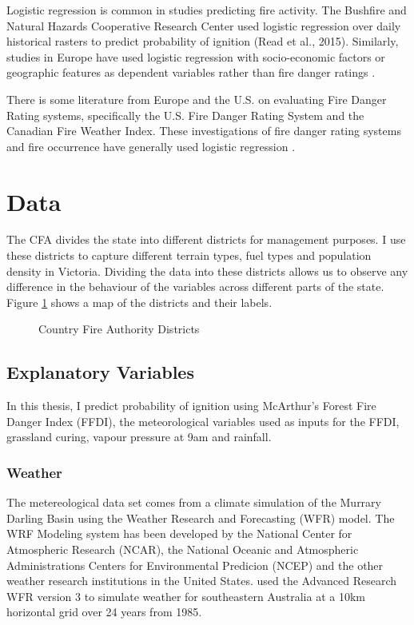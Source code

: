 \documentclass[11pt,a4paper]{article}
\begin{document}
Logistic regression is common in studies predicting fire activity. The Bushfire and Natural Hazards Cooperative Research Center used logistic regression over daily historical rasters to predict probability of ignition (Read et al., 2015). Similarly, studies in Europe have used logistic regression with socio-economic factors or geographic features as dependent variables rather than fire danger ratings \citep{del11, zhang13}. 

There is some literature from Europe and the U.S. on evaluating Fire Danger Rating systems, specifically the U.S. Fire Danger Rating System and the Canadian Fire Weather Index.  These investigations of fire danger rating systems and fire occurrence have  generally used logistic regression \citep{andrews03, padilla11}. 

\section{Data}

The CFA divides the state into different districts for management purposes. I use these districts to capture different terrain types, fuel types and population density in Victoria. Dividing the data into these districts allows us to observe any difference in the behaviour of the variables across different parts of the state. Figure \ref{fig:dist} shows a map of the districts and their labels. 

\begin{figure}[h]
	\centering 
	\caption{Country Fire Authority Districts} 
	\label{fig:dist} 
\end{figure}

\subsection{Explanatory Variables}

In this thesis, I predict probability of ignition using McArthur's Forest Fire Danger Index (FFDI), the meteorological variables used as inputs for the FFDI, grassland curing, vapour pressure at 9am and rainfall.  

\subsubsection{Weather}

The metereological data set comes from a climate simulation of the Murrary Darling Basin using the Weather Research and Forecasting (WFR) model. The WRF Modeling system has been developed by the National Center for Atmospheric Research (NCAR), the National Oceanic and Atmospheric Administrations Centers for Environmental Predicion (NCEP) and the other weather research institutions in the United States. \citet{evans10} used the Advanced Research WFR version 3 \citep{skamarock08} to simulate weather for southeastern Australia at a 10km horizontal grid over 24 years from 1985.
\end{document}
